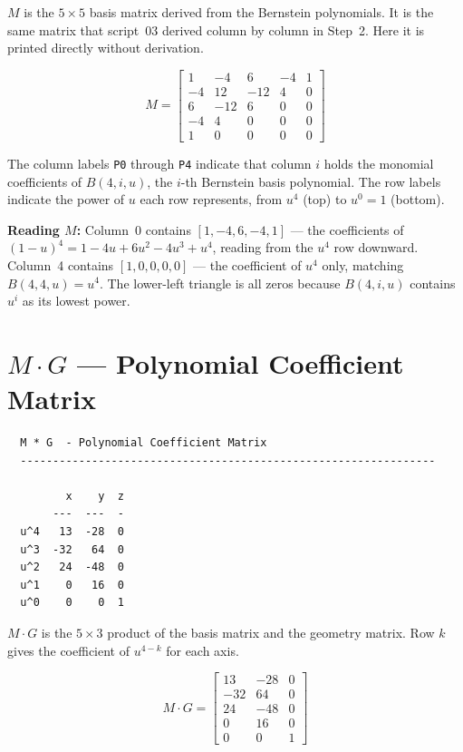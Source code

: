 \documentclass[12pt, a4paper]{article}
\newcommand{\cd}[1]{\texttt{#1}}
\begin{document}
$M$ is the $5 \times 5$ basis matrix derived from the
Bernstein polynomials.
It is the same matrix that script~03 derived column by
column in Step~2.
Here it is printed directly without derivation.

\[
  M = \begin{bmatrix}
    1  & -4 &  6 & -4 & 1 \\
   -4  & 12 & -12 & 4 & 0 \\
    6  & -12 &  6 &  0 & 0 \\
   -4  &  4 &  0 &  0 & 0 \\
    1  &  0 &  0 &  0 & 0
  \end{bmatrix}
\]

The column labels \cd{P0} through \cd{P4} indicate that
column $i$ holds the monomial coefficients of $B(4,i,u)$,
the $i$-th Bernstein basis polynomial.
The row labels indicate the power of $u$ each row represents,
from $u^4$ (top) to $u^0 = 1$ (bottom).

\begin{notebox}
\textbf{Reading $M$:}
Column~0 contains $[1, -4, 6, -4, 1]$ --- the coefficients
of $(1-u)^4 = 1 - 4u + 6u^2 - 4u^3 + u^4$,
reading from the $u^4$ row downward.
Column~4 contains $[1, 0, 0, 0, 0]$ --- the coefficient of
$u^4$ only, matching $B(4,4,u) = u^4$.
The lower-left triangle is all zeros because $B(4,i,u)$
contains $u^i$ as its lowest power.
\end{notebox}


\section{$M \cdot G$ --- Polynomial Coefficient Matrix}

\begin{verbatim}
  M * G  - Polynomial Coefficient Matrix
  ----------------------------------------------------------------

         x    y  z
       ---  ---  -
  u^4   13  -28  0
  u^3  -32   64  0
  u^2   24  -48  0
  u^1    0   16  0
  u^0    0    0  1
\end{verbatim}

$M \cdot G$ is the $5 \times 3$ product of the basis matrix
and the geometry matrix.
Row $k$ gives the coefficient of $u^{4-k}$ for each axis.

\[
  M \cdot G = \begin{bmatrix}
    13  & -28 & 0 \\
   -32  &  64 & 0 \\
    24  & -48 & 0 \\
     0  &  16 & 0 \\
     0  &   0 & 1
  \end{bmatrix}
\]
\end{document}

